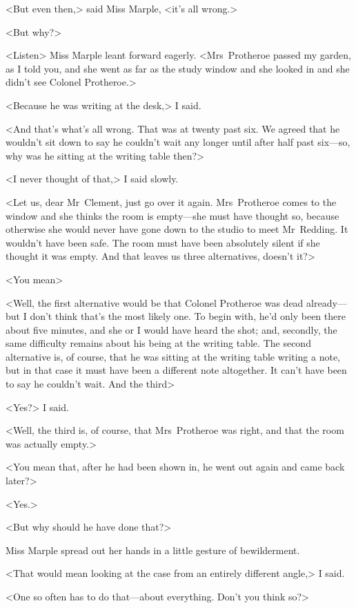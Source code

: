 <But even then,> said Miss Marple, <it's all wrong.>

<But why?>

<Listen\longdash> Miss Marple leant forward eagerly. <Mrs~Protheroe passed my garden, as I told you, and she went as far as the study window and she looked in and she didn't see Colonel Protheroe.>

<Because he was writing at the desk,> I said.

<And that's what's all wrong. That was at twenty past six. We agreed that he wouldn't sit down to say he couldn't wait any longer until after half past six—so, why was he sitting at the writing table then?>

<I never thought of that,> I said slowly.

<Let us, dear Mr~Clement, just go over it again. Mrs~Protheroe comes to the window and she thinks the room is empty—she must have thought so, because otherwise she would never have gone down to the studio to meet Mr~Redding. It wouldn't have been safe. The room must have been absolutely silent if she thought it was empty. And that leaves us three alternatives, doesn't it?>

<You mean\longdash>

<Well, the first alternative would be that Colonel Protheroe was dead already—but I don't think that's the most likely one. To begin with, he'd only been there about five minutes, and she or I would have heard the shot; and, secondly, the same difficulty remains about his being at the writing table. The second alternative is, of course, that he was sitting at the writing table writing a note, but in that case it must have been a different note altogether. It can't have been to say he couldn't wait. And the third\longdash>

<Yes?> I said.

<Well, the third is, of course, that Mrs~Protheroe was right, and that the room was actually empty.>

<You mean that, after he had been shown in, he went out again and came back later?>

<Yes.>

<But why should he have done that?>

Miss Marple spread out her hands in a little gesture of bewilderment.

<That would mean looking at the case from an entirely different angle,> I said.

<One so often has to do that—about everything. Don't you think so?>

